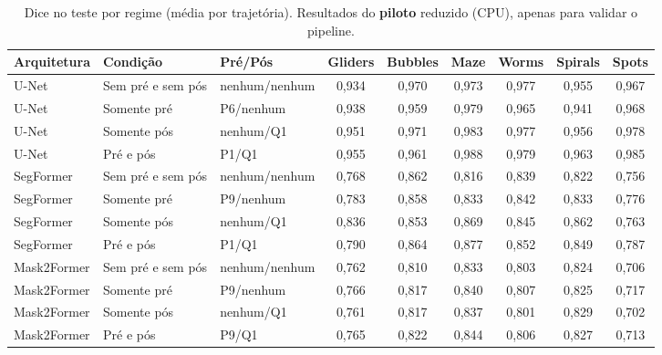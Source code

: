 \begin{table}[t]\centering\scriptsize\setlength{\tabcolsep}{3pt}
\caption{Dice no teste por regime (média por trajetória). Resultados do \textbf{piloto} reduzido (CPU), apenas para validar o pipeline.}\label{tab:regimes}
\begin{tabular}{lllcccccc}
\toprule
Arquitetura & Condição & Pré/Pós & Gliders & Bubbles & Maze & Worms & Spirals & Spots \\
\midrule
U-Net & Sem pré e sem pós & nenhum/nenhum & 0,934 & 0,970 & 0,973 & 0,977 & 0,955 & 0,967 \\
U-Net & Somente pré & P6/nenhum & 0,938 & 0,959 & 0,979 & 0,965 & 0,941 & 0,968 \\
U-Net & Somente pós & nenhum/Q1 & 0,951 & 0,971 & 0,983 & 0,977 & 0,956 & 0,978 \\
U-Net & Pré e pós & P1/Q1 & 0,955 & 0,961 & 0,988 & 0,979 & 0,963 & 0,985 \\
\midrule
SegFormer & Sem pré e sem pós & nenhum/nenhum & 0,768 & 0,862 & 0,816 & 0,839 & 0,822 & 0,756 \\
SegFormer & Somente pré & P9/nenhum & 0,783 & 0,858 & 0,833 & 0,842 & 0,833 & 0,776 \\
SegFormer & Somente pós & nenhum/Q1 & 0,836 & 0,853 & 0,869 & 0,845 & 0,862 & 0,763 \\
SegFormer & Pré e pós & P1/Q1 & 0,790 & 0,864 & 0,877 & 0,852 & 0,849 & 0,787 \\
\midrule
Mask2Former & Sem pré e sem pós & nenhum/nenhum & 0,762 & 0,810 & 0,833 & 0,803 & 0,824 & 0,706 \\
Mask2Former & Somente pré & P9/nenhum & 0,766 & 0,817 & 0,840 & 0,807 & 0,825 & 0,717 \\
Mask2Former & Somente pós & nenhum/Q1 & 0,761 & 0,817 & 0,837 & 0,801 & 0,829 & 0,702 \\
Mask2Former & Pré e pós & P9/Q1 & 0,765 & 0,822 & 0,844 & 0,806 & 0,827 & 0,713 \\
\bottomrule
\end{tabular}
\end{table}
